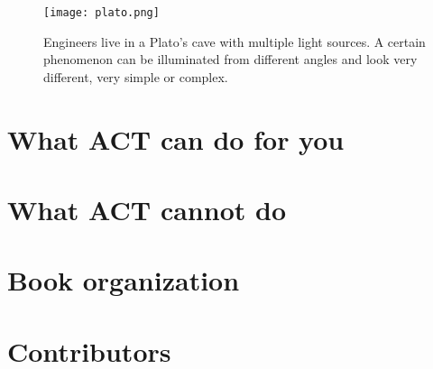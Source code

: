 \begin{figure}[h]
    \centering
\texttt{[image: plato.png]}
\caption{\label{fig:aspects}
    Engineers live in a Plato's cave with multiple light sources.
    A certain phenomenon can be illuminated from different angles
    and look very different, very simple or complex.
}
\end{figure}


\section{What ACT can do for you}




\section{What ACT cannot do}


\section{Book organization}


\section{Contributors}

